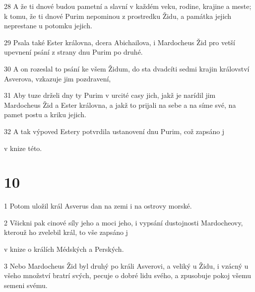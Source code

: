 \par 28 A že ti dnové budou pametní a slavní v každém veku, rodine, krajine a meste; k tomu, že ti dnové Purim nepominou z prostredku Židu, a památka jejich neprestane u potomku jejich.
\par 29 Psala také Ester královna, dcera Abichailova, i Mardocheus Žid pro vetší upevnení psání z strany dnu Purim po druhé.
\par 30 A on rozeslal to psání ke všem Židum, do sta dvadcíti sedmi krajin království Asverova, vzkazuje jim pozdravení,
\par 31 Aby tuze drželi dny ty Purim v urcité casy jich, jakž je narídil jim Mardocheus Žid a Ester královna, a jakž to prijali na sebe a na síme své, na pamet postu a kriku jejich.
\par 32 A tak výpoved Estery potvrdila ustanovení dnu Purim, což zapsáno j\par v knize této.

\chapter{10}

\par 1 Potom uložil král Asverus dan na zemi i na ostrovy morské.
\par 2 Všickni pak cinové síly jeho a moci jeho, i vypsání dustojnosti Mardocheovy, kterouž ho zvelebil král, to vše zapsáno j\par v knize o králích Médských a Perských.
\par 3 Nebo Mardocheus Žid byl druhý po králi Asverovi, a veliký u Židu, i vzácný u všeho množství bratrí svých, pecuje o dobré lidu svého, a zpusobuje pokoj všemu semeni svému.

